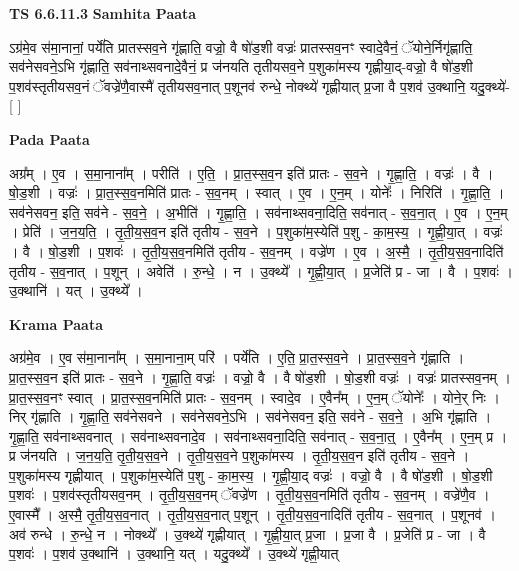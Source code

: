 \documentclass[17pt]{extarticle}
\begin{document}
\textbf{TS 6.6.11.3 } \newline
\textbf{Samhita Paata} \newline

ऽग्र॑मे॒व स॑मा॒नानां॒ पर्ये॑ति प्रातस्सव॒ने गृ॑ह्णाति॒ वज्रो॒ वै षो॑ड॒शी वज्रः॑ प्रातस्सव॒नꣳ स्वादे॒वैनं॒ ॅयोने॒र्निगृ॑ह्णाति॒ सव॑नेसवने॒ऽभि गृ॑ह्णाति॒ सव॑नाथ्सवनादे॒वैनं॒ प्र ज॑नयति तृतीयसव॒ने प॒शुका॑मस्य गृह्णीया॒द्-वज्रो॒ वै षो॑ड॒शी प॒शव॑स्तृतीयसव॒नं ॅवज्रे॑णै॒वास्मै॑ तृतीयसव॒नात् प॒शूनव॑ रुन्धे॒ नोक्थ्ये॑ गृह्णीयात् प्र॒जा वै प॒शव॑ उ॒क्थानि॒ यदु॒क्थ्ये॑- [  ] \newline

\textbf{Pada Paata} \newline

अग्र᳚म् । ए॒व । स॒मा॒नाना᳚म् । परीति॑ । ए॒ति॒ । प्रा॒त॒स्स॒व॒न इति॑ प्रातः - स॒व॒ने । गृ॒ह्णा॒ति॒ । वज्रः॑ । वै । षो॒ड॒शी । वज्रः॑ । प्रा॒त॒स्स॒व॒नमिति॑ प्रातः - स॒व॒नम् । स्वात् । ए॒व । ए॒न॒म् । योनेः᳚ । निरिति॑ । गृ॒ह्णा॒ति॒ । सव॑नेसवन॒ इति॒ सव॑ने - स॒व॒ने॒ । अ॒भीति॑ । गृ॒ह्णा॒ति॒ । सव॑नाथ्सवना॒दिति॒ सव॑नात् - स॒व॒ना॒त् । ए॒व । ए॒न॒म् । प्रेति॑ । ज॒न॒य॒ति॒ । तृ॒ती॒य॒स॒व॒न इति॑ तृतीय - स॒व॒ने । प॒शुका॑म॒स्येति॑ प॒शु - का॒म॒स्य॒ । गृ॒ह्णी॒या॒त् । वज्रः॑ । वै । षो॒ड॒शी । प॒शवः॑ । तृ॒ती॒य॒स॒व॒नमिति॑ तृतीय - स॒व॒नम् । वज्रे॑ण । ए॒व । अ॒स्मै॒ । तृ॒ती॒य॒स॒व॒नादिति॑ तृतीय - स॒व॒नात् । प॒शून् । अवेति॑ । रु॒न्धे॒ । न । उ॒क्थ्ये᳚ । गृ॒ह्णी॒या॒त् । प्र॒जेति॑ प्र - जा । वै । प॒शवः॑ । उ॒क्थानि॑ । यत् । उ॒क्थ्ये᳚ ।  \newline


\textbf{Krama Paata} \newline

अग्र॑मे॒व । ए॒व स॑मा॒नाना᳚म् । स॒मा॒नाना॒म् परि॑ । पर्ये॑ति । ए॒ति॒ प्रा॒त॒स्स॒व॒ने । प्रा॒त॒स्स॒व॒ने गृ॑ह्णाति । प्रा॒त॒स्स॒व॒न इति॑ प्रातः - स॒व॒ने । गृ॒ह्णा॒ति॒ वज्रः॑ । वज्रो॒ वै । वै षो॑ड॒शी । षो॒ड॒शी वज्रः॑ । वज्रः॑ प्रातस्सव॒नम् । प्रा॒त॒स्स॒व॒नꣳ स्वात् । प्रा॒त॒स्स॒व॒नमिति॑ प्रातः - स॒व॒नम् । स्वादे॒व । ए॒वैन᳚म् । ए॒न॒म् ॅयोनेः᳚ । योने॒र् निः । निर् गृ॑ह्णाति । गृ॒ह्णा॒ति॒ सव॑नेसवने । सव॑नेसवने॒ऽभि । सव॑नेसवन॒ इति॒ सव॑ने - स॒व॒ने॒ । अ॒भि गृ॑ह्णाति । गृ॒ह्णा॒ति॒ सव॑नाथ्सवनात् । सव॑नाथ्सवनादे॒व । सव॑नाथ्सवना॒दिति॒ सव॑नात् - स॒व॒ना॒त्॒ । ए॒वैन᳚म् । ए॒न॒म् प्र । प्र ज॑नयति । ज॒न॒य॒ति॒ तृ॒ती॒य॒स॒व॒ने । तृ॒ती॒य॒स॒व॒ने प॒शुका॑मस्य । तृ॒ती॒य॒स॒व॒न इति॑ तृतीय - स॒व॒ने । प॒शुका॑मस्य गृह्णीयात् । प॒शुका॑म॒स्येति॑ प॒शु - का॒म॒स्य॒ । गृ॒ह्णी॒या॒द् वज्रः॑ । वज्रो॒ वै । वै षो॑ड॒शी । षो॒ड॒शी प॒शवः॑ । प॒शव॑स्तृतीयसव॒नम् । तृ॒ती॒य॒स॒व॒नम् ॅवज्रे॑ण । तृ॒ती॒य॒स॒व॒नमिति॑ तृतीय - स॒व॒नम् । वज्रे॑णै॒व । ए॒वास्मै᳚ । अ॒स्मै॒ तृ॒ती॒य॒स॒व॒नात् । तृ॒ती॒य॒स॒व॒नात् प॒शून् । तृ॒ती॒य॒स॒व॒नादिति॑ तृतीय - स॒व॒नात् । प॒शूनव॑ । अव॑ रुन्धे । रु॒न्धे॒ न । नोक्थ्ये᳚ । उ॒क्थ्ये॑ गृह्णीयात् । गृ॒ह्णी॒या॒त् प्र॒जा । प्र॒जा वै । प्र॒जेति॑ प्र - जा । वै प॒शवः॑ । प॒शव॑ उ॒क्थानि॑ । उ॒क्थानि॒ यत् । यदु॒क्थ्ये᳚ । उ॒क्थ्ये॑ गृह्णी॒यात् \newline
\end{document}
